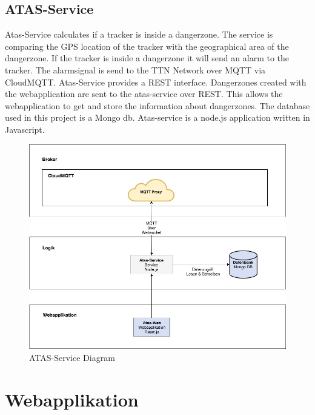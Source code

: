 \documentclass[11pt,english,german]{report}
\theoremstyle{definition}
\begin{document}
\subsection{ATAS-Service}
Atas-Service calculates if a tracker is inside a dangerzone. The service is comparing the
GPS location of the tracker with the geographical area of the dangerzone. If the tracker
is inside a dangerzone it will send an alarm to the tracker. The alarmsignal is send to the
TTN Network over MQTT via CloudMQTT.
Atas-Service provides a REST interface. Dangerzones created with the webapplication are
sent to the atas-service over REST. This allows the webapplication to get and store the
information about dangerzones. The database used in this project is a Mongo db.
Atas-service is a node.js application written in Javascript.
\begin{figure}[H]
	\centering
	\includegraphics[width=\textwidth]{img/system/ATAS_SystemOverview_ATASService.jpg}
	\caption[ATAS-Service Diagram]
	{ATAS-Service Diagram}
\end{figure}
\newpage

\section{Webapplikation}
\end{document}
